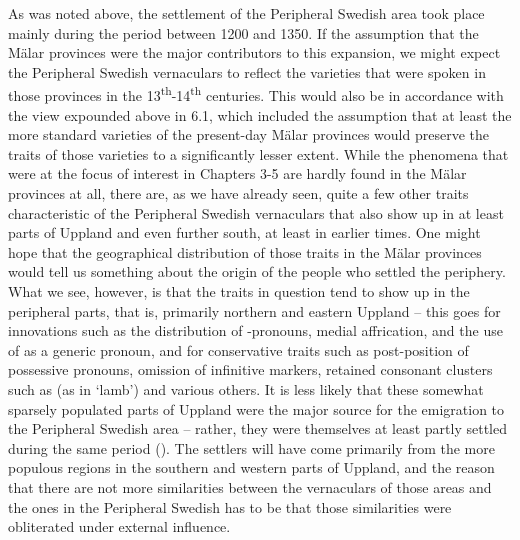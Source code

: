 As was noted above, the settlement of the Peripheral Swedish area took place mainly during the period between 1200 and 1350. If the assumption that the Mälar provinces were the major contributors to this expansion, we might expect the Peripheral Swedish vernaculars to reflect the varieties that were spoken in those provinces in the 13\textsuperscript{th}{}-14\textsuperscript{th} centuries. This would also be in accordance with the view expounded above in 6.1, which included the assumption that at least the more standard varieties of the present-day Mälar provinces would preserve the traits of those varieties to a significantly lesser extent. While the phenomena that were at the focus of interest in Chapters 3{}-5 are hardly found in the Mälar provinces at all, there are, as we have already seen, quite a few other traits characteristic of the Peripheral Swedish vernaculars that also show up in at least parts of Uppland and even further south, at least in earlier times. One might hope that the geographical distribution of those traits in the Mälar provinces would tell us something about the origin of the people who settled the periphery. What we see, however, is that the traits in question tend to show up in the peripheral parts, that is, primarily northern and eastern Uppland – this goes for innovations such as the distribution of -pronouns, medial affrication, and the use of  as a generic pronoun, and for conservative traits such as post-position of possessive pronouns, omission of infinitive markers, retained consonant clusters such as (as in ‘lamb’)\textit{ }and various others. It is less likely that these somewhat sparsely populated parts of Uppland were the major source for the emigration to the Peripheral Swedish area – rather, they were themselves at least partly settled during the same period (\citet{Broberg1990}). The settlers will have come primarily from the more populous regions in the southern and western parts of Uppland, and the reason that there are not more similarities between the vernaculars of those areas and the ones in the Peripheral Swedish has to be that those similarities were obliterated under external influence. 


